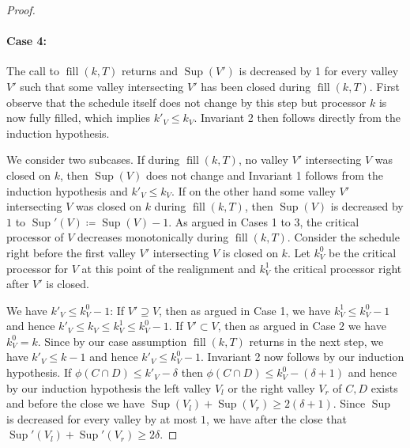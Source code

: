 \documentclass[a4paper]{article}
\DeclareMathOperator{\fillop}{fill}
\DeclareMathOperator{\res}{Sup}
\begin{document}
\begin{proof}
  \paragraph{Case 4:}
      The call to $\fillop(k, T)$ returns and $\res(V')$ is decreased by 1 for every valley $V'$ such that some valley intersecting $V'$ has been closed during $\fillop(k, T)$.
      First observe that the schedule itself does not change by this step but processor $k$ is now fully filled, which implies $k'_V \leq k_V$.
      Invariant 2 then follows directly from the induction hypothesis.

      We consider two subcases.
      If during $\fillop(k, T)$, no valley $V'$ intersecting $V$ was closed on $k$, then $\res(V)$ does not change and Invariant 1 follows from the induction hypothesis and $k'_V \leq k_V$.
      If on the other hand some valley $V'$ intersecting $V$ was closed on $k$ during $\fillop(k, T)$, then $\res(V)$ is decreased by $1$ to $\res'(V) \coloneqq \res(V) - 1$.
      As argued in Cases 1 to 3, the critical processor of $V$ decreases monotonically during $\fillop(k, T)$.
      Consider the schedule right before the first valley $V'$ intersecting $V$ is closed on $k$.
      Let $k^0_V$ be the critical processor for $V$ at this point of the realignment and $k^1_V$ the critical processor right after $V'$ is closed.

      We have $k'_V \leq k^0_V - 1$:
      If $V' \supseteq V$, then as argued in Case 1, we have $k^1_V \leq k^0_V - 1$ and hence $k'_V \leq k_V \leq k^1_V \leq k^0_V -1$.
      If $V' \subset V$, then as argued in Case 2 we have $k^0_V = k$.
      Since by our case assumption $\fillop(k, T)$ returns in the next step, we have $k'_V \leq k - 1$ and hence $k'_V \leq k^0_V -1$.
      Invariant 2 now follows by our induction hypothesis.
      If $\phi(C \cap D) \leq k'_V - \delta$ then $\phi(C \cap D) \leq k^0_V - (\delta + 1)$ and hence by our induction hypothesis the left valley $V_l$ or the right valley $V_r$ of $C, D$ exists and before the close we have $\res(V_l) + \res(V_r) \geq 2 (\delta + 1)$.
      Since $\res$ is decreased for every valley by at most $1$, we have after the close that $\res'(V_l) + \res'(V_r) \geq 2 \delta$.


\end{proof}
\end{document}
